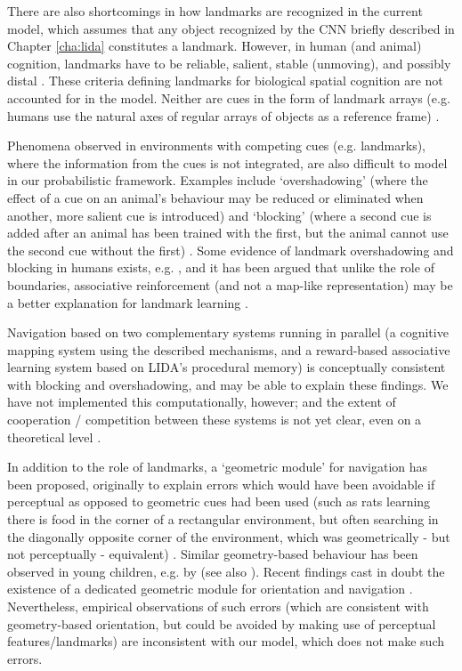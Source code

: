 There are also shortcomings in how landmarks are recognized in the current model, which assumes that any object recognized by the CNN briefly described in Chapter \ref{cha:lida} constitutes a landmark. However, in human (and animal) cognition, landmarks have to be reliable, salient, stable (unmoving), and possibly distal \citep{lew2011looking}. These criteria defining landmarks for biological spatial cognition are not accounted for in the model. Neither are cues in the form of landmark arrays (e.g. humans use the natural axes of regular arrays of objects as a reference frame) \citep{lew2011looking, burgess2006spatial}. 

Phenomena observed in environments with competing cues (e.g. landmarks), where the information from the cues is not integrated, are also difficult to model in our probabilistic framework. Examples include `overshadowing' (where the effect of a cue on an animal's behaviour may be reduced or eliminated when another, more salient cue is introduced) and `blocking' (where a second cue is added after an animal has been trained with the first, but the animal cannot use the second cue without the first) \citep{chamizo2003acquisition}. Some evidence of landmark overshadowing and blocking in humans exists, e.g. \citep{spetch1995overshadowing, prados2011blocking}, and it has been argued that unlike the role of boundaries, associative reinforcement (and not a map-like representation) may be a better explanation for landmark learning \citep{doeller2008distinct}. 

Navigation based on two complementary systems running in parallel (a cognitive mapping system using the described mechanisms, and a reward-based associative learning system based on LIDA's procedural memory) is conceptually consistent with blocking and overshadowing, and may be able to explain these findings. We have not implemented this computationally, however; and the extent of cooperation / competition between these systems is not yet clear, even on a theoretical level \citep{lew2011looking, cheng201325}.

In addition to the role of landmarks, a `geometric module' for navigation has been proposed, originally to explain errors which would have been avoidable if perceptual as opposed to geometric cues had been used (such as rats learning there is food in the corner of a rectangular environment, but often searching in the diagonally opposite corner of the environment, which was geometrically - but not perceptually - equivalent) \citep{cheng1986purely}. Similar geometry-based behaviour has been observed in young children, e.g. by \cite{huttenlocher1999spatial} (see also \citep{cheng201325}). Recent findings cast in doubt the existence of a dedicated geometric module for orientation and navigation \citep{cheng2008whither}. Nevertheless, empirical observations of such errors (which are consistent with geometry-based orientation, but could be avoided by making use of perceptual features/landmarks) are inconsistent with our model, which does not make such errors.

